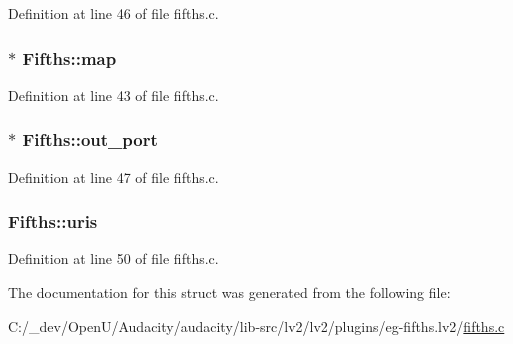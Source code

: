 Definition at line 46 of file fifths.\+c.

\subsubsection[{\texorpdfstring{map}{map}}]{$\ast$ Fifths\+::map}\hypertarget{struct_fifths_abcd05d6db9f1cd97b5f1fe851c600a0b}{}\label{struct_fifths_abcd05d6db9f1cd97b5f1fe851c600a0b}


Definition at line 43 of file fifths.\+c.

\subsubsection[{\texorpdfstring{out\+\_\+port}{out_port}}]{$\ast$ Fifths\+::out\+\_\+port}\hypertarget{struct_fifths_a10d7dec668d3efc5b6d396b5f1161c26}{}\label{struct_fifths_a10d7dec668d3efc5b6d396b5f1161c26}


Definition at line 47 of file fifths.\+c.

\subsubsection[{\texorpdfstring{uris}{uris}}]{ Fifths\+::uris}\hypertarget{struct_fifths_a25f2db18a39f50822cd2f95b428650c8}{}\label{struct_fifths_a25f2db18a39f50822cd2f95b428650c8}


Definition at line 50 of file fifths.\+c.



The documentation for this struct was generated from the following file\+:\begin{DoxyCompactItemize}
\item 
C\+:/\+\_\+dev/\+Open\+U/\+Audacity/audacity/lib-\/src/lv2/lv2/plugins/eg-\/fifths.\+lv2/\hyperlink{fifths_8c}{fifths.\+c}\end{DoxyCompactItemize}

